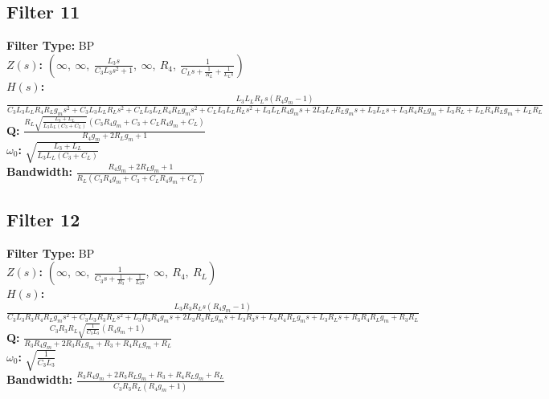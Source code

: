 \documentclass{article}
\begin{document}
\subsection*{Filter 11}
\textbf{Filter Type:} BP \\ 
\textbf{$Z(s)$:} $\left( \infty, \  \infty, \  \frac{L_{3} s}{C_{3} L_{3} s^{2} + 1}, \  \infty, \  R_{4}, \  \frac{1}{C_{L} s + \frac{1}{R_{L}} + \frac{1}{L_{L} s}}\right)$ \\ 
\textbf{$H(s)$:} $\frac{L_{3} L_{L} R_{L} s \left(R_{4} g_{m} - 1\right)}{C_{3} L_{3} L_{L} R_{4} R_{L} g_{m} s^{2} + C_{3} L_{3} L_{L} R_{L} s^{2} + C_{L} L_{3} L_{L} R_{4} R_{L} g_{m} s^{2} + C_{L} L_{3} L_{L} R_{L} s^{2} + L_{3} L_{L} R_{4} g_{m} s + 2 L_{3} L_{L} R_{L} g_{m} s + L_{3} L_{L} s + L_{3} R_{4} R_{L} g_{m} + L_{3} R_{L} + L_{L} R_{4} R_{L} g_{m} + L_{L} R_{L}}$ \\ 
\textbf{Q:} $\frac{R_{L} \sqrt{\frac{L_{3} + L_{L}}{L_{3} L_{L} \left(C_{3} + C_{L}\right)}} \left(C_{3} R_{4} g_{m} + C_{3} + C_{L} R_{4} g_{m} + C_{L}\right)}{R_{4} g_{m} + 2 R_{L} g_{m} + 1}$ \\ 
\textbf{$\omega_0$:} $\sqrt{\frac{L_{3} + L_{L}}{L_{3} L_{L} \left(C_{3} + C_{L}\right)}}$ \\ 
\textbf{Bandwidth:} $\frac{R_{4} g_{m} + 2 R_{L} g_{m} + 1}{R_{L} \left(C_{3} R_{4} g_{m} + C_{3} + C_{L} R_{4} g_{m} + C_{L}\right)}$ \\ 
\subsection*{Filter 12}
\textbf{Filter Type:} BP \\ 
\textbf{$Z(s)$:} $\left( \infty, \  \infty, \  \frac{1}{C_{3} s + \frac{1}{R_{3}} + \frac{1}{L_{3} s}}, \  \infty, \  R_{4}, \  R_{L}\right)$ \\ 
\textbf{$H(s)$:} $\frac{L_{3} R_{3} R_{L} s \left(R_{4} g_{m} - 1\right)}{C_{3} L_{3} R_{3} R_{4} R_{L} g_{m} s^{2} + C_{3} L_{3} R_{3} R_{L} s^{2} + L_{3} R_{3} R_{4} g_{m} s + 2 L_{3} R_{3} R_{L} g_{m} s + L_{3} R_{3} s + L_{3} R_{4} R_{L} g_{m} s + L_{3} R_{L} s + R_{3} R_{4} R_{L} g_{m} + R_{3} R_{L}}$ \\ 
\textbf{Q:} $\frac{C_{3} R_{3} R_{L} \sqrt{\frac{1}{C_{3} L_{3}}} \left(R_{4} g_{m} + 1\right)}{R_{3} R_{4} g_{m} + 2 R_{3} R_{L} g_{m} + R_{3} + R_{4} R_{L} g_{m} + R_{L}}$ \\ 
\textbf{$\omega_0$:} $\sqrt{\frac{1}{C_{3} L_{3}}}$ \\ 
\textbf{Bandwidth:} $\frac{R_{3} R_{4} g_{m} + 2 R_{3} R_{L} g_{m} + R_{3} + R_{4} R_{L} g_{m} + R_{L}}{C_{3} R_{3} R_{L} \left(R_{4} g_{m} + 1\right)}$ \\ 
\end{document}
